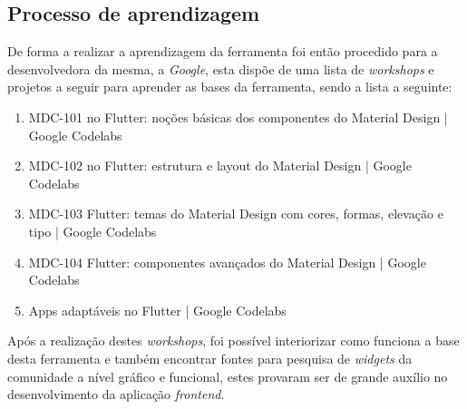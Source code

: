 \subsection{Processo de aprendizagem}
De forma a realizar a aprendizagem da ferramenta foi então procedido para a desenvolvedora da mesma, a \textit{Google}, esta dispõe de uma lista de \textit{workshops} e projetos a seguir para aprender as bases da ferramenta, sendo a lista a seguinte:

\begin{enumerate}
  \item MDC-101 no Flutter: noções básicas dos componentes do Material Design | Google Codelabs
  \item MDC-102 no Flutter: estrutura e layout do Material Design | Google Codelabs
  \item MDC-103 Flutter: temas do Material Design com cores, formas, elevação e tipo | Google Codelabs
  \item MDC-104 Flutter: componentes avançados do Material Design | Google Codelabs
  \item Apps adaptáveis no Flutter | Google Codelabs
\end{enumerate}

Após a realização destes \textit{workshops}, foi possível interiorizar como funciona a base desta ferramenta e também encontrar fontes para pesquisa de \textit{widgets} da comunidade a nível gráfico e funcional, estes provaram ser de grande auxílio no desenvolvimento da aplicação \textit{frontend}.